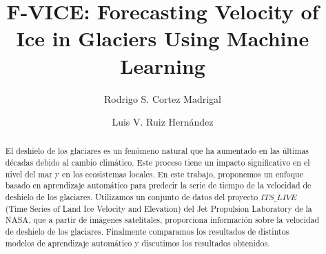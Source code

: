 \documentclass[sigconf,language=spanish]{acmart}
\begin{document}
\title{F-VICE: Forecasting Velocity of Ice in Glaciers Using
  Machine Learning}

\author{Rodrigo S. Cortez Madrigal}
\authornotemark[1]

\author{Luis V. Ruiz Hernández}
\authornotemark[1]


\begin{abstract}
  El deshielo de los glaciares es un fenómeno natural
  que ha aumentado en las últimas décadas debido al cambio climático.
  Este proceso tiene un impacto significativo en el nivel del mar y en los ecosistemas locales.  
  En este trabajo, proponemos un enfoque basado en aprendizaje automático para predecir la serie de tiempo de la velocidad de deshielo de los glaciares. 
  Utilizamos un conjunto de datos del proyecto $ITS\_LIVE$ (Time Series of Land Ice Velocity and Elevation) del Jet Propulsion Laboratory de la NASA, que a partir de imágenes satelitales, proporciona información sobre la velocidad de deshielo de los glaciares.
  Finalmente comparamos los resultados de distintos modelos de aprendizaje automático y discutimos los resultados obtenidos.
\end{abstract}
\end{document}
